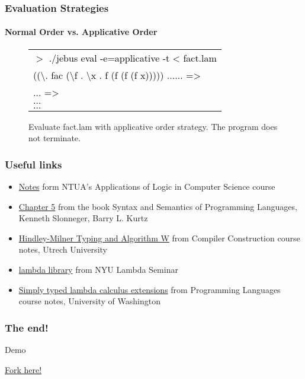 \documentclass[xcolor=table]{beamer}
\begin{document}
\begin{frame}
\frametitle{Evaluation Strategies}
\framesubtitle{Normal Order vs. Applicative Order}
\begin{block}{
		 \begin{figure}[h!]
				\begin{footnotesize}
				 \begin{tabular}{l}
				 \textcolor{black}{
			      $>$ ./jebus eval -e=applicative -t < fact.lam} \\
			      \textcolor{black}{((\textbackslash . fac (\textbackslash f . \textbackslash x . f (f (f (f x))))) $\ldots \ldots$ =>} \\ 
			      \textcolor{black}{$\ldots$ =>} \\
				  \textcolor{black}{$\ldots$} \\
			      \textcolor{black}{$\ldots$} \\
			      \end{tabular}	
			  \end{footnotesize}			  
			  \caption{Evaluate fact.lam with applicative order strategy. The program does not terminate.}
		 \end{figure}	          
}
\end{block}
\end{frame}

\begin{frame}
\frametitle{Useful links}
\begin{block}
{
\begin{footnotesize}
\begin{itemize}
\item \href{http://www.math.ntua.gr/logic/lambda/notes/shmeiwseis-2011.pdf}{Notes} form NTUA's Applications of Logic in Computer Science course %
\item \href{http://homepage.cs.uiowa.edu/~slonnegr/plf/Book/Chapter5.pdf}{Chapter 5} from the book Syntax and Semantics of Programming Languages, Kenneth Slonneger, Barry L. Kurtz
\item \href{http://www.cs.uu.nl/wiki/pub/Cco/CourseSchedule/cco-09-typesystems-2x2.pdf}{Hindley-Milner Typing and Algorithm W} from Compiler Construction course notes, Utrech University %
\item \href{http://lambda.jimpryor.net/lambda_library/}{lambda library} from NYU Lambda Seminar %
\item \href{http://homes.cs.washington.edu/~djg/2011sp/lec11_6up.pdf}{Simply typed lambda calculus extensions} from Programming Languages course notes, University of Washington %
\end{itemize}
\end{footnotesize}
}

\end{block}
\end{frame}

\begin{frame}
\frametitle{The end!}
\begin{block}
{\begin{center}
{\large Demo}
\end{center}}
\begin{center}
 \href{https://github.com/zoep/jebus}{Fork here!}
 \end{center} 
\end{block}
\end{frame}
\end{document}
